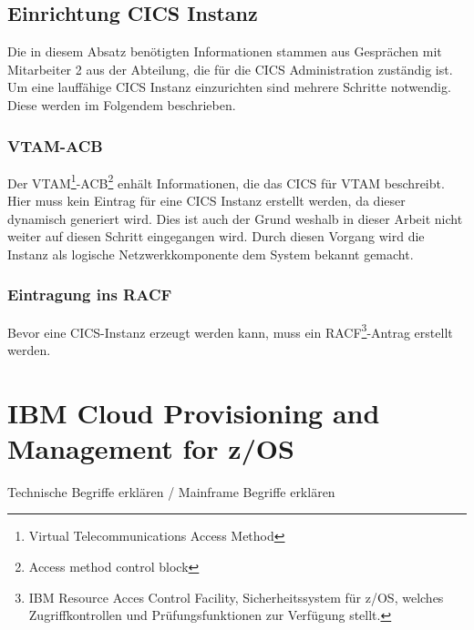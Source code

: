 \subsection{Einrichtung CICS Instanz}\label{subsec:createCICS}
Die in diesem Absatz benötigten Informationen stammen aus Gesprächen mit Mitarbeiter 2 aus der Abteilung, die für die CICS Administration zuständig ist.
Um eine lauffähige CICS Instanz einzurichten sind mehrere Schritte notwendig.
Diese werden im Folgendem beschrieben.

\subsubsection{VTAM-ACB}
Der VTAM\footnote{Virtual Telecommunications Access Method\cite{Rogers.2011}}-ACB\footnote{Access method control block\cite{IBM.2014}} enhält Informationen, die das CICS für VTAM beschreibt.
Hier muss kein Eintrag für eine CICS Instanz erstellt werden, da dieser dynamisch generiert wird.
Dies ist auch der Grund weshalb in dieser Arbeit nicht weiter auf diesen Schritt eingegangen wird.
Durch diesen Vorgang wird die Instanz als logische Netzwerkkomponente dem System bekannt gemacht.

\subsubsection{Eintragung ins RACF}
Bevor eine CICS-Instanz erzeugt werden kann, muss ein RACF\footnote{IBM Resource Acces Control Facility, Sicherheitssystem für z/OS, welches Zugriffkontrollen und Prüfungsfunktionen zur Verfügung stellt.\cite{Winnard.2015}}-Antrag erstellt werden.

\section{IBM Cloud Provisioning and Management for z/OS}\label{sec:zosmf}

Technische Begriffe erklären / Mainframe Begriffe erklären

